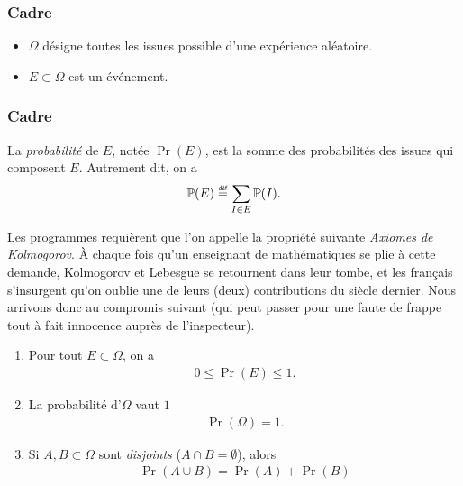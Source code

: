 \documentclass[main.tex]{subfiles}
\begin{document}
\begin{definition}

    \subsubsection{Cadre}
    \begin{itemize}
        \item $\Omega$ désigne toutes les issues possible d'une expérience aléatoire.
        \item $E \subset \Omega$ est un événement.
    \end{itemize}

    \subsubsection{Cadre}
    La \emph{probabilité} de $E$,
    notée $\Pr(E)$,
    est la somme des probabilités des issues qui composent $E$.
    Autrement dit,
    on a
    \begin{align}
        \Pr(E) \defeq \sum_{I \in E} \Pr(I).
    \end{align}
\end{definition}

Les programmes requièrent que l'on appelle la propriété suivante \emph{Axiomes de Kolmogorov}.
À chaque fois qu'un enseignant de mathématiques se plie à cette demande,
Kolmogorov et Lebesgue se retournent dans leur tombe,
et les français s'insurgent qu'on oublie une de leurs (deux) contributions du siècle dernier.
Nous arrivons donc au compromis suivant
(qui peut passer pour une faute de frappe tout à fait innocence auprès de l'inspecteur).

\begin{proposition}

    \begin{enumerate}
        \item Pour tout $E \subset \Omega$,
            on a
            \begin{align}
                0 \leq \Pr(E) \leq 1.
            \end{align}
        \item La probabilité d'$\Omega$ vaut $1$
            \begin{align}
                \Pr(\Omega) = 1.
            \end{align}
        \item Si $A, B \subset \Omega$ sont \emph{disjoints} ($A \cap B = \emptyset$),
            alors
            \begin{align}
                \Pr (A \cup B) = \Pr(A) + \Pr(B)
            \end{align}
    \end{enumerate}
\end{proposition}
\end{document}
